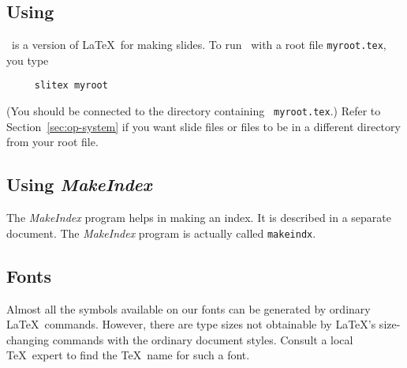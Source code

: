  
\subsection{Using \SLiTeX}
 
\SLiTeX\ is a version of \LaTeX\ for making slides.
To run \SLiTeX\  with a root file \mbox{\tt myroot.tex}, you type
\begin{verbatim}
     slitex myroot
\end{verbatim}
(You should be connected to the directory containing \mbox{\tt
myroot.tex}.) Refer to Section~\ref{sec:op-system} if you want slide
files or \hbox{\verb||} files to be in a different directory from
your root file.
  
\subsection{Using {\em MakeIndex\/}} \label{sec:makeindex}
 
The {\em MakeIndex\/} program helps in making an index.  It is 
described in a separate document.
The {\em MakeIndex} program is actually called {\tt makeindx}.

 
\subsection{Fonts}
 
Almost all the symbols available on our fonts can be generated by
ordinary \LaTeX\ commands.  However, there are type sizes not
obtainable by \LaTeX's size-changing commands with the ordinary
document styles.  Consult a local \TeX\ expert to find the
\TeX\ name for such a font.
 
